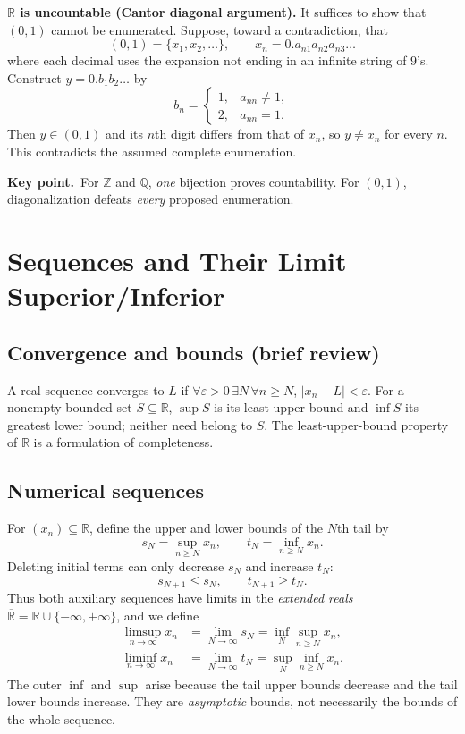 \documentclass[10pt,a4paper]{article}
\newcommand{\Z}{\mathbb Z}
\newcommand{\Q}{\mathbb Q}
\newcommand{\R}{\mathbb R}
\newcommand{\Rbar}{\overline{\mathbb R}}
\newcommand{\key}[1]{\par\smallskip\textcolor{accent}{\textbf{Key point.}}\ #1\par}
\begin{document}
\textbf{$\R$ is uncountable (Cantor diagonal argument).} It suffices to show that $(0,1)$ cannot be enumerated. Suppose, toward a contradiction, that
\[
(0,1)=\{x_1,x_2,\ldots\},\qquad x_n=0.a_{n1}a_{n2}a_{n3}\ldots
\]
where each decimal uses the expansion not ending in an infinite string of $9$'s. Construct $y=0.b_1b_2\ldots$ by
\[
b_n=\begin{cases}1,&a_{nn}\ne1,\\2,&a_{nn}=1.\end{cases}
\]
Then $y\in(0,1)$ and its $n$th digit differs from that of $x_n$, so $y\ne x_n$ for every $n$. This contradicts the assumed complete enumeration.

\key{For $\Z$ and $\Q$, \emph{one} bijection proves countability. For $(0,1)$, diagonalization defeats \emph{every} proposed enumeration.}

\section{Sequences and Their Limit Superior/Inferior}
\subsection{Convergence and bounds (brief review)}
A real sequence converges to $L$ if $\forall\varepsilon>0\,\exists N\,\forall n\ge N$, $|x_n-L|<\varepsilon$. For a nonempty bounded set $S\subseteq\R$, $\sup S$ is its least upper bound and $\inf S$ its greatest lower bound; neither need belong to $S$. The least-upper-bound property of $\R$ is a formulation of completeness.

\subsection{Numerical sequences}
For $(x_n)\subseteq\R$, define the upper and lower bounds of the $N$th tail by
\[
s_N=\sup_{n\ge N}x_n,\qquad t_N=\inf_{n\ge N}x_n.
\]
Deleting initial terms can only decrease $s_N$ and increase $t_N$:
\[
s_{N+1}\le s_N,\qquad t_{N+1}\ge t_N.
\]
Thus both auxiliary sequences have limits in the \emph{extended reals} $\Rbar=\R\cup\{-\infty,+\infty\}$, and we define
\[
\boxed{\begin{aligned}
\limsup_{n\to\infty}x_n&=\lim_{N\to\infty}s_N=\inf_N\sup_{n\ge N}x_n,\\
\liminf_{n\to\infty}x_n&=\lim_{N\to\infty}t_N=\sup_N\inf_{n\ge N}x_n.
\end{aligned}}
\]
The outer $\inf$ and $\sup$ arise because the tail upper bounds decrease and the tail lower bounds increase. They are \emph{asymptotic} bounds, not necessarily the bounds of the whole sequence.
\end{document}
